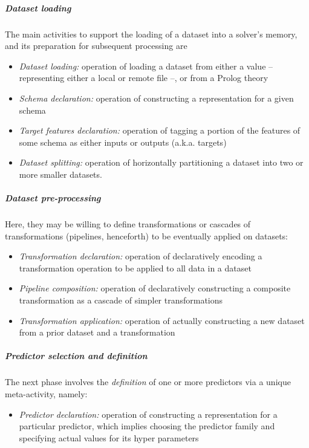 \documentclass[runningheads]{llncs}
\begin{document}
\subparagraph{Dataset loading}
%
The main activities to support the loading of a dataset into a solver's memory, and its preparation for subsequent processing are
%
\begin{itemize}
    \item \emph{Dataset loading:} operation of loading a dataset from either a value -- representing either a local or remote file --, or from a Prolog theory
    \item \emph{Schema declaration:}  operation of constructing a representation for a given schema
    \item \emph{Target features declaration:} operation of tagging a portion of the features of some schema as either inputs or outputs (a.k.a. targets)
    \item \emph{Dataset splitting:} operation of horizontally partitioning a dataset into two or more smaller datasets.
\end{itemize}

\subparagraph{Dataset pre-processing}
%
Here, they may be willing to define transformations or cascades of transformations (pipelines, henceforth) to be eventually applied on datasets:
%
\begin{itemize}
    \item \emph{Transformation declaration:} operation of declaratively encoding a transformation operation to be applied to all data in a dataset
    \item \emph{Pipeline composition:} operation of declaratively constructing a composite transformation as a cascade of simpler transformations
    \item \emph{Transformation application:} operation of actually constructing a new dataset from a prior dataset and a transformation
\end{itemize}

\subparagraph{Predictor selection and definition}
%
The next phase involves the \emph{definition} of one or more predictors via a unique meta-activity, namely:
%
\begin{itemize}
    \item \emph{Predictor declaration:} operation of constructing a representation for a particular predictor, which implies choosing the predictor family and specifying actual values for its hyper parameters
\end{itemize}
\end{document}
